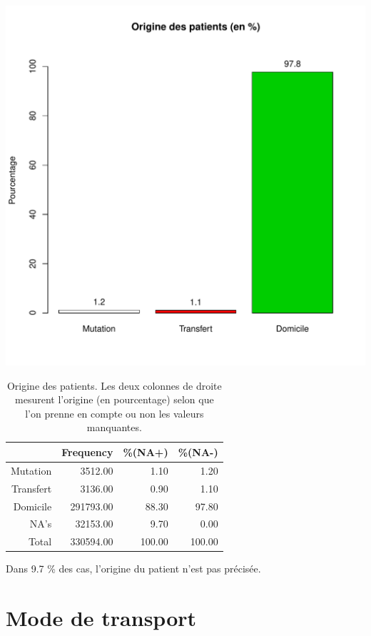 \documentclass[12pt,english,french,twoside]{report}\usepackage[]{graphicx}\usepackage[]{color}
\makeatletter
\def\maxwidth{ %
  \ifdim\Gin@nat@width>\linewidth
    \linewidth
  \else
    \Gin@nat@width
  \fi
}
\makeatother
\begin{document}
\includegraphics[width=\maxwidth]{figure/mode_entree} 
\begin{table}[ht]
\centering
\begin{tabular}{rrrr}
  \hline
 & Frequency &   \%(NA+) &   \%(NA-) \\ 
  \hline
Mutation & 3512.00 & 1.10 & 1.20 \\ 
  Transfert & 3136.00 & 0.90 & 1.10 \\ 
  Domicile & 291793.00 & 88.30 & 97.80 \\ 
  NA's & 32153.00 & 9.70 & 0.00 \\ 
    Total & 330594.00 & 100.00 & 100.00 \\ 
   \hline
\end{tabular}
\caption[Origine des patients]{Origine des patients. Les deux colonnes de droite mesurent l'origine (en pourcentage) selon que l'on prenne en compte ou non les valeurs manquantes. } 
\label{origine}
\end{table}



Dans 9.7 \% des cas, l'origine du patient n'est pas précisée.

\section*{Mode de transport}
\end{document}
